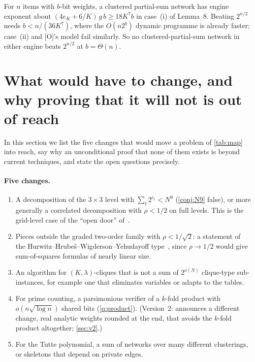 \documentclass[10pt]{amsart}
\theoremstyle{plain}
\theoremstyle{definition}
\theoremstyle{remark}
\numberwithin{equation}{section}
\newcommand{\Oa}{\textup{[O]}}
\begin{document}
\begin{proposition}\label{prop:subsetsum}
For $n$ items with $b$-bit weights, a clustered partial-sum network has engine exponent about
$(4e_K+6/K)\,g\,b\ge18K^7b$ in case~(i) of Lemma~8. Beating $2^{n/2}$ needs $b<n/(36K^7)$, where the
$O(n2^b)$ dynamic programme is already faster; case~(ii) and \Oa's model fail similarly. So no
clustered-partial-sum network in either engine beats $2^{n/2}$ at $b=\Theta(n)$.
\end{proposition}

\section{What would have to change, and why proving that it will not is out of reach}\label{sec:change}

In this section we list the five changes that would move a problem of \cref{tab:map} into reach, say
why an unconditional proof that none of them exists is beyond current techniques, and state the open
questions precisely.

\paragraph{Five changes.}
\begin{enumerate}[label=(\roman*)]
\item A decomposition of the $3\times3$ level with $\sum_t2^{c_t}<N^9$ (\cref{conj:N9} false), or more
generally a correlated decomposition with $\rho<1/2$ on full levels. This is the grid-level case of the
``open door'' of~\cite[\S4.8 and Open Problem~5]{Maj26}.
\item Pieces outside the graded two-order family with $\rho<1/\sqrt2$: a statement of the
Hurwitz--Hrube\v{s}--Wigderson--Yehudayoff type~\cite{HWY11}, since $\rho\to1/2$ would give
sum-of-squares formulas of nearly linear size.
\item An algorithm for $(K,\lambda)$-cliques that is not a sum of $2^{o(N)}$ clique-type
sub-instances, for example one that eliminates variables or adapts to the tables.
\item For prime counting, a parsimonious verifier of a $k$-fold product with $o(n\sqrt{\log n})$ shared
bits (\cref{q:product}). (Version~2: \cite{Ni26} announces a different change, real analytic weights
rounded at the end, that avoids the $k$-fold product altogether; \cref{sec:v2}.)
\item For the Tutte polynomial, a sum of networks over many different clusterings, or skeletons that
depend on private edges.
\end{enumerate}
\end{document}
